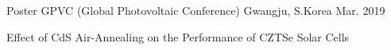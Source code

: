 

\begin{cventries}

  \cventry
    {Poster } %
    {GPVC (Global Photovoltaic Conference)} %
    {Gwangju, S.Korea} %
    {Mar. 2019} %
    {
      \begin{cvitems} %
        \item {Effect of CdS Air-Annealing on the Performance of CZTSe Solar Cells}
      \end{cvitems}
    }
\end{cventries}
